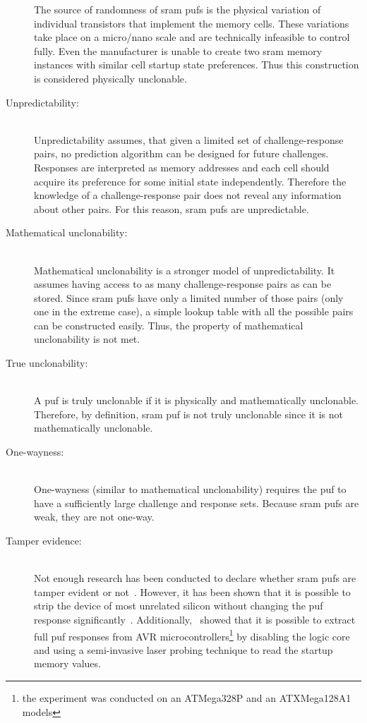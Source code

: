 \begin{description}
        The source of randomness of \gls{sram} \glspl{puf} is the physical variation of individual transistors that implement the memory cells. These variations take place on a micro/nano scale and are technically infeasible to control fully. Even the manufacturer is unable to create two \gls{sram} memory instances with similar cell startup state preferences. Thus this construction is considered physically unclonable.
    \item[Unpredictability:] \hfill \\
        Unpredictability assumes, that given a limited set of challenge-response pairs, no prediction algorithm can be designed for future challenges. Responses are interpreted as memory addresses and each cell should acquire its preference for some initial state independently. Therefore the knowledge of a challenge-response pair does not reveal any information about other pairs. For this reason, \gls{sram} \glspl{puf} are unpredictable.
    \item[Mathematical unclonability:] \hfill \\
        Mathematical unclonability is a stronger model of unpredictability. It assumes having access to as many challenge-response pairs as can be stored. Since \gls{sram} \glspl{puf} have only a limited number of those pairs (only one in the extreme case), a simple lookup table with all the possible pairs can be constructed easily. Thus, the property of mathematical unclonability is not met.
    \item[True unclonability:] \hfill \\
        A \gls{puf} is truly unclonable if it is physically and mathematically unclonable. Therefore, by definition, \gls{sram} \gls{puf} is not truly unclonable since it is not mathematically unclonable.
    \item[One-wayness:] \hfill \\
        One-wayness (similar to mathematical unclonability) requires the \gls{puf} to have a sufficiently large challenge and response sets. Because \gls{sram} \glspl{puf} are weak, they are not one-way.
    \item[Tamper evidence:] \hfill \\
        Not enough research has been conducted to declare whether \gls{sram} \glspl{puf} are tamper evident or not~\cite{Maes2012}. However, it has been shown that it is possible to strip the device of most unrelated silicon without changing the \gls{puf} response significantly~\cite{Helfmaier2013}. Additionally,~\cite{Nedospasov2013} showed that it is possible to extract full \gls{puf} responses from AVR microcontrollers\footnote{the experiment was conducted on an ATMega328P and an ATXMega128A1 models} by disabling the logic core and using a semi-invasive laser probing technique to read the startup memory values.
\end{description}



